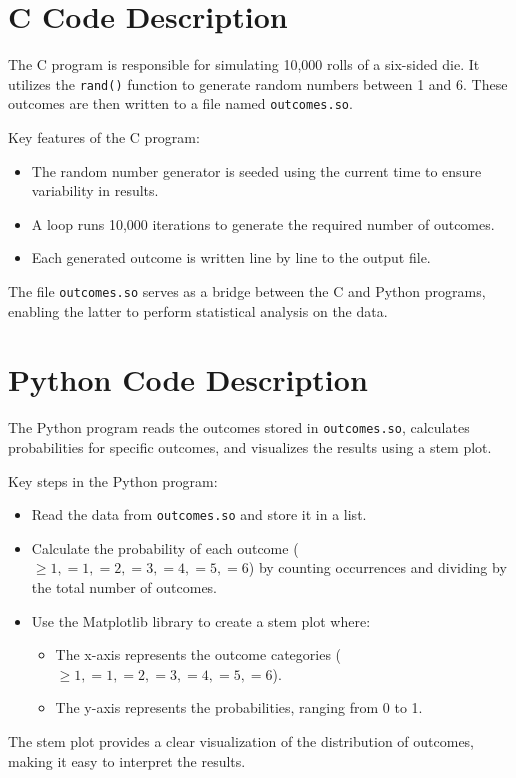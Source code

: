 \documentclass[journal]{IEEEtran}
\begin{document}
	\section*{C Code Description}
	The C program is responsible for simulating 10,000 rolls of a six-sided die. It utilizes the \texttt{rand()} function to generate random numbers between 1 and 6. These outcomes are then written to a file named \texttt{outcomes.so}.
	
	Key features of the C program:
	\begin{itemize}
		\item The random number generator is seeded using the current time to ensure variability in results.
		\item A loop runs 10,000 iterations to generate the required number of outcomes.
		\item Each generated outcome is written line by line to the output file.
	\end{itemize}
	
	The file \texttt{outcomes.so} serves as a bridge between the C and Python programs, enabling the latter to perform statistical analysis on the data.
	
	\section*{Python Code Description}
	The Python program reads the outcomes stored in \texttt{outcomes.so}, calculates probabilities for specific outcomes, and visualizes the results using a stem plot.
	
	Key steps in the Python program:
	\begin{itemize}
		\item Read the data from \texttt{outcomes.so} and store it in a list.
		\item Calculate the probability of each outcome (\( \geq 1, =1, =2, =3, =4, =5, =6 \)) by counting occurrences and dividing by the total number of outcomes.
		\item Use the Matplotlib library to create a stem plot where:
		\begin{itemize}
			\item The x-axis represents the outcome categories (\( \geq 1, =1, =2, =3, =4, =5, =6 \)).
			\item The y-axis represents the probabilities, ranging from 0 to 1.
		\end{itemize}
	\end{itemize}
	
	The stem plot provides a clear visualization of the distribution of outcomes, making it easy to interpret the results.
	
\end{document}

